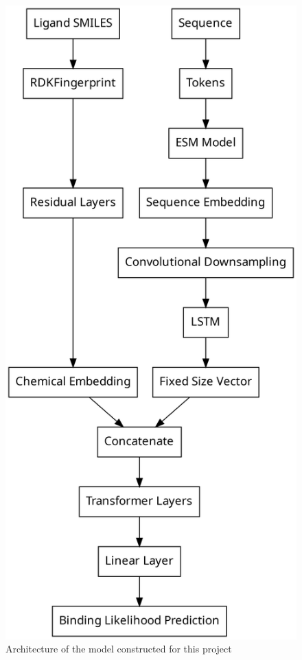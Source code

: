 \documentclass{article}
\begin{document}
\begin{figure}
	\begin{center}
	\caption{\label{modelarch} Architecture of the model constructed for this project}
	\includegraphics[height=0.8\textheight]{img/model.png}
	\end{center}
\end{figure}
\end{document}
